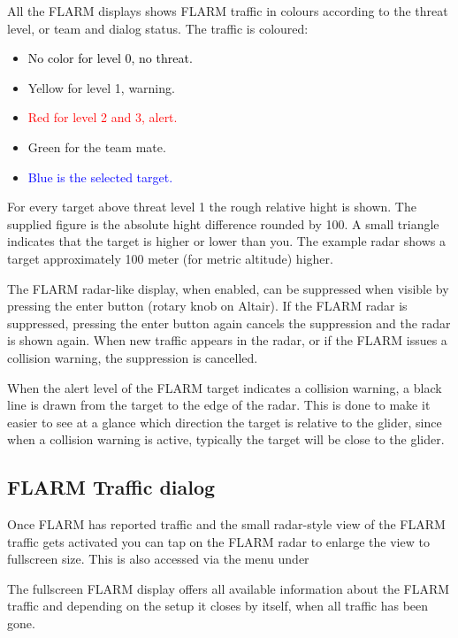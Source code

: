 \documentclass[a4paper,12pt]{refrep}
\begin{document}
All the FLARM displays shows FLARM traffic in colours according to
the threat level, or team and dialog status.  The traffic is coloured:
\begin{itemize}
\item \textcolor{black} {No color for level 0, no threat.} 
\item \textcolor{warning} { Yellow for level 1, warning.}
\item \textcolor{red} {Red for level 2 and 3, alert.}
\item \textcolor{teammate} {Green for the team mate.}
\item \textcolor{blue} {Blue is the selected target.}
\end{itemize}

For every target above threat level 1 the rough relative hight is shown. The
supplied figure is the absolute hight difference rounded by 100.  A small
triangle indicates that the target is higher or lower than you. The example
radar shows a target approximately 100 meter (for metric altitude) higher.

The FLARM radar-like display, when enabled, can be suppressed when
visible by pressing the enter button (rotary knob on Altair).  If the
FLARM radar is suppressed, pressing the enter button again cancels the
suppression and the radar is shown again.  When new traffic appears in
the radar, or if the FLARM issues a collision warning, the suppression
is cancelled.

When the alert level of the FLARM target indicates a collision
warning, a black line is drawn from the target to the edge of the
radar.  This is done to make it easier to see at a glance which
direction the target is relative to the glider, since when a collision
warning is active, typically the target will be close to the glider.

\subsection*{FLARM Traffic dialog}
Once FLARM has reported traffic and the small radar-style view of the FLARM
traffic gets activated   you can tap on the FLARM radar to
enlarge the view to fullscreen size.  This is also accessed via the menu under
\begin{quote}
\blink{}\blink{}\blink{}
\end{quote}
The fullscreen FLARM display offers all available information
about the FLARM traffic and depending on the setup it closes by itself, when all
traffic has been gone.
\end{document}
